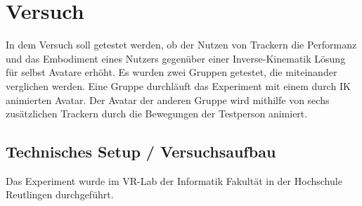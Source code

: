 \chapter{Versuch}
In dem Versuch soll getestet werden, ob der Nutzen von Trackern die Performanz und das Embodiment eines Nutzers gegenüber einer Inverse-Kinematik Lösung für selbst Avatare erhöht. Es wurden zwei Gruppen getestet, die miteinander verglichen werden. Eine Gruppe durchläuft das Experiment mit einem durch IK animierten Avatar. Der Avatar der anderen Gruppe wird mithilfe von sechs zusätzlichen Trackern durch die Bewegungen der Testperson animiert.

\section{Technisches Setup / Versuchsaufbau}
Das Experiment wurde im VR-Lab der Informatik Fakultät in der Hochschule Reutlingen durchgeführt. 




